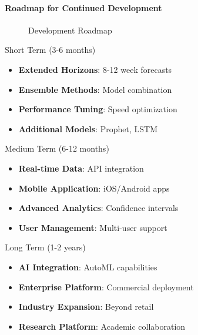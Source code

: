 { 
	\framesubtitle{Roadmap for Continued Development}
	
	\begin{figure}
		\centering
			
		\caption{Development Roadmap}
	\end{figure}
	
	\begin{block}{Short Term (3-6 months)}
		\begin{itemize}
			\item \textbf{Extended Horizons}: 8-12 week forecasts
			\item \textbf{Ensemble Methods}: Model combination
			\item \textbf{Performance Tuning}: Speed optimization
			\item \textbf{Additional Models}: Prophet, LSTM
		\end{itemize}
	\end{block}
	
	\begin{block}{Medium Term (6-12 months)}
		\begin{itemize}
			\item \textbf{Real-time Data}: API integration
			\item \textbf{Mobile Application}: iOS/Android apps
			\item \textbf{Advanced Analytics}: Confidence intervals
			\item \textbf{User Management}: Multi-user support
		\end{itemize}
	\end{block}
	
	\begin{block}{Long Term (1-2 years)}
		\begin{itemize}
			\item \textbf{AI Integration}: AutoML capabilities
			\item \textbf{Enterprise Platform}: Commercial deployment
			\item \textbf{Industry Expansion}: Beyond retail
			\item \textbf{Research Platform}: Academic collaboration
		\end{itemize}
	\end{block}
}


